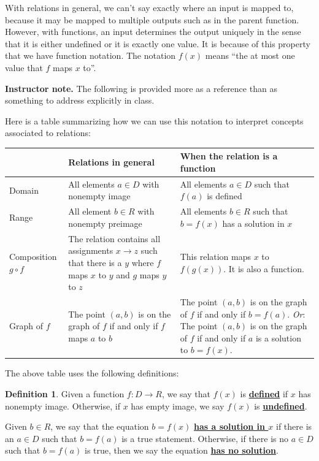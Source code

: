 \documentclass[11pt]{article}
\newcommand\smallnote[1]
	{\begin{mdframed}\raggedright  {\bf Instructor note.} {#1} \end{mdframed}}
\renewcommand\emph[1]{\underline{\bf{#1}}} %
\theoremstyle{definition}
\newtheorem{definition}[theorem]{Definition}
\begin{document}
\vspace*{-6pt}
With relations in general, we can't say exactly where an input is mapped to, because it may be mapped to multiple outputs such as in the parent function. However, with functions, an input determines the output uniquely in the sense that it is either undefined or it is exactly one value. It is because of this property that we have function notation. The notation $f(x)$ means ``the at most one value that $f$ maps $x$ to''.

\smallnote{
 The following is provided more as a reference than as something to address explicitly in class. }

Here is a table summarizing how we can use this notation to interpret concepts associated to relations:

\begin{tabular}{L{1in}L{2.5in}|L{2.5in}}
	& Relations in general & When the relation is a function \\ \hline
Domain &  All elements $a\in D$ with nonempty image 
	& All elements $a\in D$ such that $f(a)$ is defined \\
Range & All element $b \in R$ with nonempty preimage
	 & All elements $b\in R$ such that $b=f(x)$ has a solution in $x$ \\
Composition $g\circ f$ & The relation contains all assignments $x\to z$ such that there is a $y$ where $f$ maps $x$ to $y$ and $g$ maps $y$ to $z$  
	& This relation maps $x$ to $f(g(x))$. It is also a function. \\ 
Graph of $f$ & The point $(a,b)$ is on the graph of $f$ if and only if $f$ maps $a$ to $b$
	& The point $(a,b)$ is on the graph of $f$ if and only if $b=f(a)$. 
	{\it Or}: The point $(a,b)$ is on the graph of $f$ if and only if $a$ is a solution to $b=f(x)$. \\
\end{tabular}

The above table uses the following definitions:

\begin{definition}
Given a function $f:D\to R$, we say that $f(x)$ is \emph{defined} if $x$ has nonempty image. Otherwise, if $x$ has empty image, we say $f(x)$ is \emph{undefined}.

Given $b\in R$, we say that the equation $b=f(x)$ \emph{has a solution in $x$} if there is an $a\in D$ such that $b=f(a)$ is a true statement. Otherwise, if there is no $a\in D$ such that $b=f(a)$ is true, then we say the equation \emph{has no solution}.
\end{definition}
\end{document}
